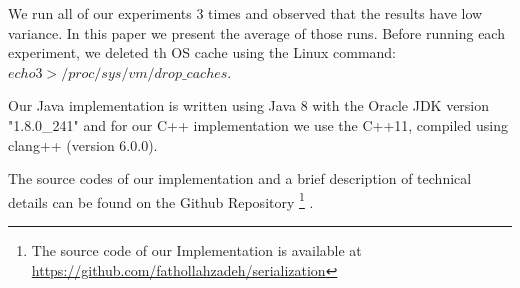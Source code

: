 We run all of our experiments 3 times and observed that the results have low variance. In this paper we present the average of those runs. Before running each experiment, we deleted th OS cache using the Linux command: $echo 3 > /proc/sys/vm/drop\_caches$.

Our Java implementation is written using Java 8 with the Oracle JDK version "1.8.0\_241" and for our C++ implementation we use the C++11, compiled using clang++ (version 6.0.0).

The source codes of our implementation and a brief description of technical details can be found on the Github Repository \footnote{The source code of our Implementation is available at \url{https://github.com/fathollahzadeh/serialization}} .
